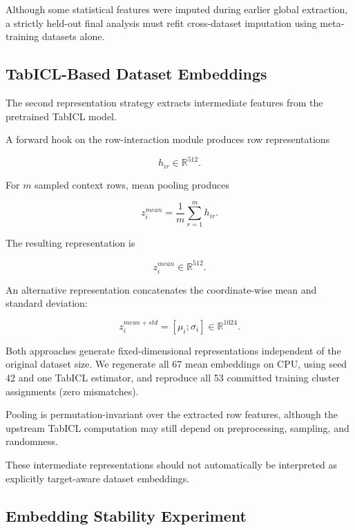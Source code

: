 \documentclass[conference]{IEEEtran}
\begin{document}
Although some statistical features were imputed during earlier global extraction, a strictly held-out final analysis must refit cross-dataset imputation using meta-training datasets alone.

\subsection{TabICL-Based Dataset Embeddings}

The second representation strategy extracts intermediate features from the pretrained TabICL model.

A forward hook on the row-interaction module produces row representations

\begin{equation}
h_{ir}\in\mathbb{R}^{512}.
\end{equation}

For $m$ sampled context rows, mean pooling produces

\begin{equation}
z_i^{mean}
=
\frac{1}{m}
\sum_{r=1}^{m}h_{ir}.
\end{equation}

The resulting representation is

\begin{equation}
z_i^{mean}\in\mathbb{R}^{512}.
\end{equation}

An alternative representation concatenates the coordinate-wise mean and standard deviation:

\begin{equation}
z_i^{mean+std}
=
[\mu_i;\sigma_i]
\in\mathbb{R}^{1024}.
\end{equation}

Both approaches generate fixed-dimensional representations independent of the original dataset size. We regenerate all 67 mean embeddings on CPU, using seed 42 and one TabICL estimator, and reproduce all 53 committed training cluster assignments (zero mismatches).

Pooling is permutation-invariant over the extracted row features, although the upstream TabICL computation may still depend on preprocessing, sampling, and randomness.

These intermediate representations should not automatically be interpreted as explicitly target-aware dataset embeddings.

\subsection{Embedding Stability Experiment}
\end{document}
